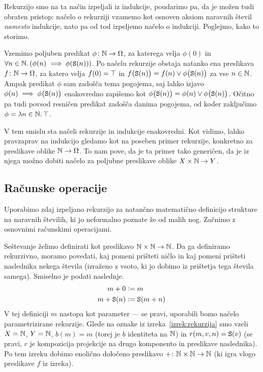Rekurzijo smo na ta način izpeljali iz indukcije, poudarimo pa, da je možen tudi obraten pristop: načelo o rekurziji vzamemo kot osnoven aksiom naravnih števil \emph{namesto} indukcije, nato pa od tod izpeljemo načelo o indukciji. Poglejmo, kako to storimo.

Vzemimo poljuben predikat $\phi\colon \mathbb{N} \to \Omega$, za katerega velja $\phi(0)$ in $\forall n \in \mathbb{N} .\, (\phi(n) \implies \phi(\mathtt{S}(n)))$. Po načelu rekurzije obstaja natanko ena preslikava $f\colon \mathbb{N} \to \Omega$, za katero velja $f(0) = \top$ in $f\big(\mathtt{S}(n)\big) = f(n) \lor \phi\big(\mathtt{S}(n)\big)$ za vse $n \in \mathbb{N}$. Ampak predikat $\phi$ sam zadošča tema pogojema, saj lahko izjavo $\phi(n) \implies \phi\big(\mathtt{S}(n)\big)$ enakovredno zapišemo kot $\phi\big(\mathtt{S}(n)\big) = \phi(n) \lor \phi\big(\mathtt{S}(n)\big)$. Očitno pa tudi povsod resničen predikat zadošča danima pogojema, od koder zaključimo $\phi = \lambda n \in \mathbb{N} .\,{\top}$.

V tem smislu sta načeli rekurzije in indukcije enakovredni. Kot vidimo, lahko pravzaprav na indukcijo gledamo kot na poseben primer rekurzije, konkretno za preslikave oblike $\mathbb{N} \to \Omega$. To nam pove, da je ta primer tako generičen, da je iz njega možno dobiti načelo za poljubne preslikave oblike $X \times \mathbb{N} \to Y$.


\subsection{Računske operacije}

Uporabimo zdaj izpeljano rekurzijo za natančno matematično definicijo strukture na naravnih številih, ki jo neformalno poznate že od malih nog. Začnimo z osnovnimi računskimi operacijami.

Seštevanje želimo definirati kot preslikavo $\mathbb{N} \times \mathbb{N} \to \mathbb{N}$. Da ga definiramo rekurzivno, moramo povedati, kaj pomeni prišteti ničlo in kaj pomeni prišteti naslednika nekega števila (izraženo z vsoto, ki jo dobimo iz prištetja tega števila samega). Smiselno je podati naslednje.
\begin{align*}
m + 0 &\mathrel{\mathop:}= m \\
m + \mathtt{S}(n) &\mathrel{\mathop:}= \mathtt{S}(m + n)
\end{align*}
V tej definiciji $m$ nastopa kot parameter --- se pravi, uporabili bomo načelo parametrizirane rekurzije. Glede na oznake iz izreka~\ref{izrek:rekurzija} smo vzeli $X = \mathbb{N}$, $Y = \mathbb{N}$, $b(m) = m$ (torej je $b$ identiteta na $\mathbb{N}$) in $r(m, v, n) = \mathtt{S}(v)$ (se pravi, $r$ je kompozicija projekcije na drugo komponento in preslikave naslednika). Po tem izreku dobimo enolično določeno preslikavo $+\colon \mathbb{N} \times \mathbb{N} \to \mathbb{N}$ (ki igra vlogo preslikave $f$ iz izreka).

